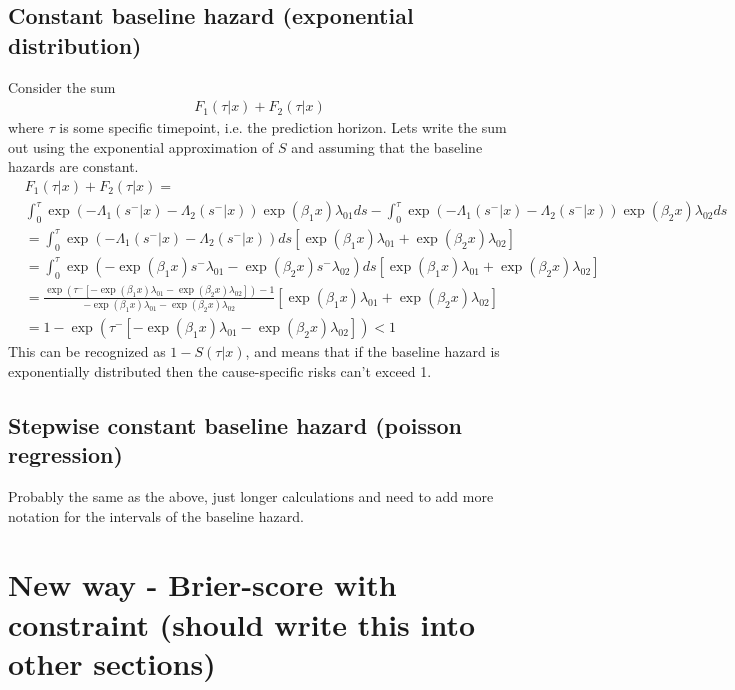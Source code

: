 \documentclass[11pt]{article}
\begin{document}
\subsection{Constant baseline hazard (exponential distribution)}
\label{sec:org425d4f9}
Consider the sum
\begin{align*}
F_1(\tau|x)+F_2(\tau|x)
\end{align*}
where \(\tau\) is some specific timepoint, i.e. the prediction horizon. Lets write the sum out using the exponential approximation of \(S\) and assuming that the baseline hazards are constant.
\begin{align*}
&F_1(\tau|x)+F_2(\tau|x) = \\
&\int_0^{\tau}\exp(-\Lambda_1(s^-|x)-\Lambda_2(s^-|x))\exp(\beta_1x)\lambda_{01}ds-
\int_0^{\tau}\exp(-\Lambda_1(s^-|x)-\Lambda_2(s^-|x))\exp(\beta_2x)\lambda_{02}ds\\
&= \int_0^{\tau}\exp(-\Lambda_1(s^-|x)-\Lambda_2(s^-|x))ds\left[\exp(\beta_1x)\lambda_{01}+\exp(\beta_2x)\lambda_{02}  \right]\\
&=  \int_0^{\tau}\exp(-\exp(\beta_1x)s^-\lambda_{01}-\exp(\beta_2x)s^-\lambda_{02})ds\left[\exp(\beta_1x)\lambda_{01}+\exp(\beta_2x)\lambda_{02}  \right]\\
&= \frac{\exp(\tau^-[-\exp(\beta_1x)\lambda_{01}-\exp(\beta_2x)\lambda_{02}])-1}{-\exp(\beta_1x)\lambda_{01}-\exp(\beta_2x)\lambda_{02}}[\exp(\beta_1x)\lambda_{01}+\exp(\beta_2x)\lambda_{02}]\\
&= 1-\exp(\tau^-[-\exp(\beta_1x)\lambda_{01}-\exp(\beta_2x)\lambda_{02}])<1
\end{align*}
This can be recognized as \(1-S(\tau|x)\), and means that if the baseline hazard is exponentially distributed then the cause-specific risks can't exceed 1.

\subsection{Stepwise constant baseline hazard (poisson regression)}
\label{sec:orgf634324}

Probably the same as the above, just longer calculations and need to add more notation for the intervals of the baseline hazard.



\section{New way - Brier-score with constraint (should write this into other sections)}
\label{sec:org50f897f}
\end{document}
